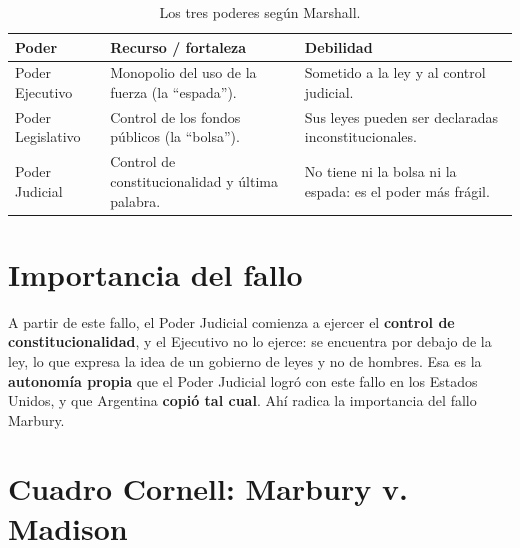 \documentclass[12pt,oneside,a4paper]{book}
\begin{document}
\begin{table}[H]
\centering
\begin{tabularx}{\textwidth}{
    >{\raggedright\arraybackslash}p{}
    >{\raggedright\arraybackslash}X
    >{\raggedright\arraybackslash}X
}
\toprule
\textbf{Poder} & \textbf{Recurso / fortaleza} & \textbf{Debilidad} \\
\midrule
Poder Ejecutivo & Monopolio del uso de la fuerza (la ``espada''). & Sometido a la ley y al control judicial. \\
\addlinespace
Poder Legislativo & Control de los fondos públicos (la ``bolsa''). & Sus leyes pueden ser declaradas inconstitucionales. \\
\addlinespace
Poder Judicial & Control de constitucionalidad y última palabra. & No tiene ni la bolsa ni la espada: es el poder más frágil. \\
\bottomrule
\end{tabularx}
\caption{Los tres poderes según Marshall.}
\end{table}

\section{Importancia del fallo}

A partir de este fallo, el Poder Judicial comienza a ejercer el \textbf{control de constitucionalidad}, y el Ejecutivo no lo ejerce: se encuentra por debajo de la ley, lo que expresa la idea de un gobierno de leyes y no de hombres. Esa es la \textbf{autonomía propia} que el Poder Judicial logró con este fallo en los Estados Unidos, y que Argentina \textbf{copió tal cual}. Ahí radica la importancia del fallo Marbury.

\section{Cuadro Cornell: Marbury v. Madison}
\end{document}
